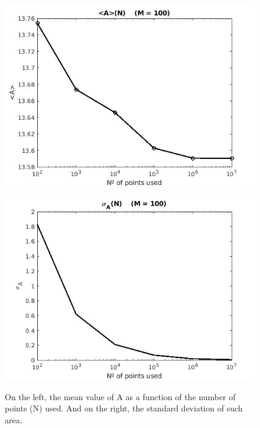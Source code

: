 \documentclass{article}
\begin{document}
\begin{figure}[h!]
\begin{minipage}[b]{0.5\linewidth}
\centering
\includegraphics[width=\linewidth]{mean_A.jpg}
\label{fig:mean_A}
\end{minipage}
\hspace{0.5cm}
\begin{minipage}[b]{0.5\linewidth}
\centering
\includegraphics[width=\linewidth]{std_A.jpg}
\label{fig:std_A}
\end{minipage}
\caption{On the left, the mean value of A as a function of the number of points (N) used. And on the right, the standard deviation of such area.}
\end{figure}
\end{document}
